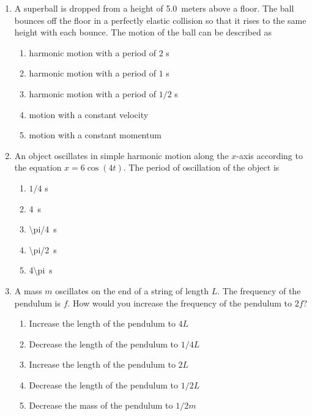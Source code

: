 \documentclass[12pt]{article}
\begin{document}
\begin{enumerate}[leftmargin=50pt,label=\underline{\hspace{0.4in}} \arabic*.]
\item A superball is dropped from a height of \SI{5.0}{meters} above a floor.
  The ball bounces off the floor in a perfectly elastic collision so that it
  rises to the same height with each bounce. The motion of the ball can be
  described as
  \begin{enumerate}[noitemsep,topsep=0pt]
  \item harmonic motion with a period of $2$ \si{s}
  \item harmonic motion with a period of $1$ \si{s}
  \item harmonic motion with a period of $1/2$ \si{s}
  \item motion with a constant velocity
  \item motion with a constant momentum
  \end{enumerate}

\item An object oscillates in simple harmonic motion along the $x$-axis
  according to the equation $x = 6 \cos(4t)$. The period of oscillation of the
  object is
  \begin{enumerate}[noitemsep,topsep=0pt]
  \item $1/4$ \si{s}
  \item\SI{4}{s}
  \item\SI{\pi/4}{s}
  \item\SI{\pi/2}{s}
  \item\SI{4\pi}{s}
  \end{enumerate}    

\item A mass $m$ oscillates on the end of a string of length $L$. The frequency
  of the pendulum is $f$. How would you increase the frequency of the
  pendulum to $2f$?
  \begin{enumerate}[noitemsep,topsep=0pt]
    \item Increase the length of the pendulum to $4L$
    \item Decrease the length of the pendulum to $1/4L$
    \item Increase the length of the pendulum to $2L$
    \item Decrease the length of the pendulum to $1/2L$
    \item Decrease the mass of the pendulum to $1/2m$
  \end{enumerate}

  \vspace{-0.1in}\begin{center}
  \end{center}


\end{enumerate}
\end{document}
